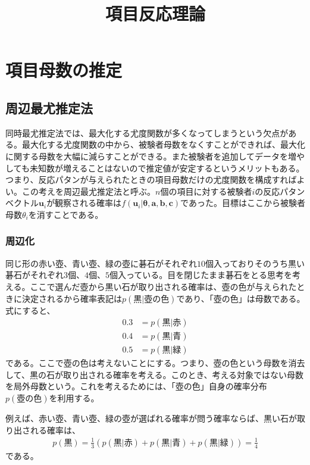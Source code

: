 \documentclass[12pt]{jarticle}
\title{項目反応理論}
\begin{document}
\maketitle
\setcounter{section}{3}
\section{項目母数の推定}
\setcounter{subsection}{1}
\subsection{周辺最尤推定法}
同時最尤推定法では、最大化する尤度関数が多くなってしまうという欠点がある。最大化する尤度関数の中から、被験者母数をなくすことができれば、最大化に関する母数を大幅に減らすことができる。また被験者を追加してデータを増やしても未知数が増えることはないので推定値が安定するというメリットもある。つまり、反応パタンが与えられたときの項目母数だけの尤度関数を構成すればよい。この考えを周辺最尤推定法と呼ぶ。$n$個の項目に対する被験者$i$の反応パタンベクトル$\boldsymbol{u}_i$が観察される確率は$f(\boldsymbol{u}_i|\boldsymbol{\theta},\boldsymbol{a,b,c})$であった。目標はここから被験者母数$\theta_i$を消すことである。
\subsubsection{周辺化}
同じ形の赤い壺、青い壺、緑の壺に碁石がそれぞれ$10$個入っておりそのうち黒い碁石がそれぞれ$3$個、$4$個、$5$個入っている。目を閉じたまま碁石をとる思考を考える。ここで選んだ壺から黒い石が取り出される確率は、壺の色が与えられたときに決定されるから確率表記は$\displaystyle p(黒|壺の色)$であり、「壺の色」は母数である。式にすると、
\begin{align*}
  \label{00}
  \displaystyle 0.3 &= p(黒|赤) \tag{4.15}\\
  0.4 &= p(黒|青) \tag{4.16} \\
  0.5 &=  p(黒|緑)\tag{4.17}
\end{align*}
である。ここで壺の色は考えないことにする。つまり、壺の色という母数を消去して、黒の石が取り出される確率を考える。このとき、考える対象ではない母数を局外母数という。これを考えるためには、「壺の色」自身の確率分布$p(壺の色)$を利用する。

例えば、赤い壺、青い壺、緑の壺が選ばれる確率が問う確率ならば、黒い石が取り出される確率は、
\begin{align}
  \label{01}
  \displaystyle p(黒) = \frac{1}{3}(p(黒|赤) + p(黒|青) +p(黒|緑) ) = \frac{1}{4} \tag{4.18}
\end{align}
である。
\end{document}
